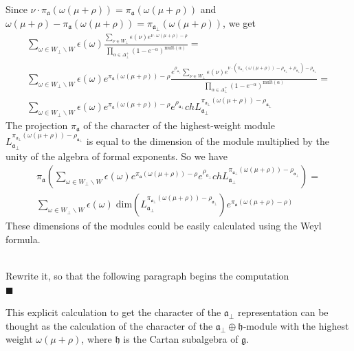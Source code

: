 \documentclass[a4paper,12pt]{article}
\theoremstyle{definition} \newtheorem{Def}{Definition}
\newenvironment{comment}
{\par\noindent{\bf TODO}\\}
{\\\hfill$\scriptstyle\blacksquare$\par}
\begin{document}
Since $\nu\cdot \pi_{\mathfrak{a}}(\omega(\mu+\rho))=\pi_{\mathfrak{a}}(\omega(\mu+\rho))$ and $\omega(\mu+\rho)-\pi_{\mathfrak{a}}(\omega(\mu+\rho))=\pi_{\mathfrak{a}_{\bot}}(\omega(\mu+\rho))$, we get
\begin{multline}
  \label{eq:14}
  \sum_{\omega\in W_{\bot}\backslash W} \epsilon(\omega) \frac{\sum_{\nu\in W_{\bot}}\epsilon(\nu) e^{\nu \cdot \omega(\mu+\rho)-\rho}}{\prod_{\alpha\in\Delta^{+}_{\bot}}(1-e^{-\alpha})^{\mathrm{mult}(\alpha)}} =\\
  \sum_{\omega\in W_{\bot}\backslash W} \epsilon(\omega) e^{\pi_{\mathfrak{a}}(\omega(\mu+\rho))-\rho} \frac{e^{\rho_{\mathfrak{a}_{\bot}} }\sum_{\nu\in W_{\bot}}\epsilon(\nu) e^{\nu \cdot (\pi_{\mathfrak{a}_{\bot}}(\omega(\mu+\rho))-\rho_{\mathfrak{a}_{\bot}}+\rho_{\mathfrak{a}_{\bot}})-\rho_{\mathfrak{a}_{\bot}}}}{\prod_{\alpha\in\Delta^{+}_{\bot}}(1-e^{-\alpha})^{\mathrm{mult}(\alpha)}}=\\
  \sum_{\omega\in W_{\bot}\backslash W} \epsilon(\omega) e^{\pi_{\mathfrak{a}}(\omega(\mu+\rho))-\rho}e^{\rho_{\mathfrak{a}_{\bot}}} ch L^{\pi_{\mathfrak{a}_{\bot}}(\omega(\mu+\rho))-\rho_{\mathfrak{a}_{\bot}}}_{\mathfrak{a}_{\bot}}
\end{multline}
The projection $\pi_{\mathfrak{a}}$ of the character of the highest-weight module $L^{\pi_{\mathfrak{a}_{\bot}}(\omega(\mu+\rho))-\rho_{\mathfrak{a}_{\bot}}}_{\mathfrak{a}_{\bot}}$ is equal to the dimension of the module multiplied by the unity of the algebra of formal exponents. So we have
  \begin{multline}
    \label{eq:15}
    \pi_{\mathfrak{a}}\left( \sum_{\omega\in W_{\bot}\backslash W} \epsilon(\omega) e^{\pi_{\mathfrak{a}}(\omega(\mu+\rho))-\rho}e^{\rho_{\mathfrak{a}_{\bot}}} ch L^{\pi_{\mathfrak{a}_{\bot}}(\omega(\mu+\rho))-\rho_{\mathfrak{a}_{\bot}}}_{\mathfrak{a}_{\bot}}\right) = \\
    \sum_{\omega\in W_{\bot}\backslash W} \epsilon(\omega)\; \mathrm{dim}\left(L^{\pi_{\mathfrak{a}_{\bot}}(\omega(\mu+\rho))-\rho_{\mathfrak{a}_{\bot}}}_{\mathfrak{a}_{\bot}}\right) e^{\pi_{\mathfrak{a}}(\omega(\mu+\rho)-\rho)}
  \end{multline}
These dimensions of the modules could be easily calculated using the Weyl formula.
\begin{comment}
  Rewrite it, so that the following paragraph begins the computation
\end{comment}
This explicit calculation to get the character of the $\mathfrak{a}_{\bot}$ representation can be thought as the calculation of the character of the $\mathfrak{a}_{\bot}\oplus \mathfrak{h}$-module with the highest weight $\omega(\mu+\rho)$, where $\mathfrak{h}$ is the Cartan subalgebra of $\mathfrak{g}$.
\end{document}
